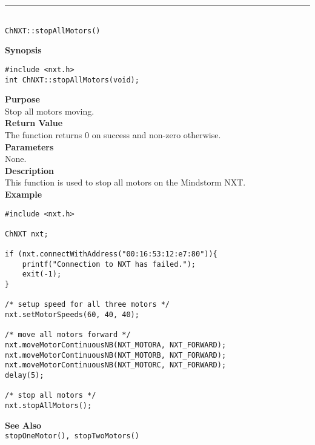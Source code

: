 \noindent
\vspace{5pt}
\rule{4.5in}{0.015in}\\
\noindent
{\LARGE \texttt{ChNXT::stopAllMotors()} }\\


\noindent
{\bf Synopsis}
\begin{lstlisting}
#include <nxt.h>
int ChNXT::stopAllMotors(void);
\end{lstlisting}

\noindent
{\bf Purpose}\\
Stop all motors moving.\\

\noindent
{\bf Return Value}\\
The function returns 0 on success and non-zero otherwise.\\

\noindent
{\bf Parameters}\\
None.\\

\noindent
{\bf Description}\\
This function is used to stop all motors on the Mindstorm NXT.\\

\noindent
{\bf Example}
\begin{lstlisting}
#include <nxt.h> 

ChNXT nxt;

if (nxt.connectWithAddress("00:16:53:12:e7:80")){
    printf("Connection to NXT has failed.");
    exit(-1);
}
    
/* setup speed for all three motors */
nxt.setMotorSpeeds(60, 40, 40);

/* move all motors forward */
nxt.moveMotorContinuousNB(NXT_MOTORA, NXT_FORWARD);
nxt.moveMotorContinuousNB(NXT_MOTORB, NXT_FORWARD);
nxt.moveMotorContinuousNB(NXT_MOTORC, NXT_FORWARD);
delay(5);

/* stop all motors */
nxt.stopAllMotors();
\end{lstlisting}

\noindent
{\bf See Also}\\
\texttt{stopOneMotor(), stopTwoMotors()}\\
